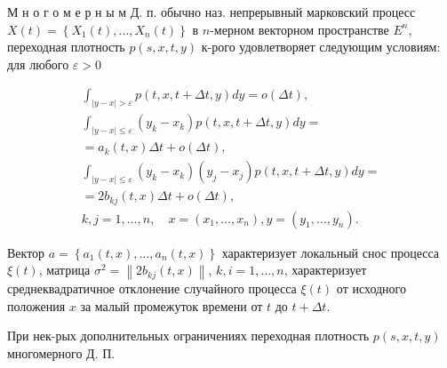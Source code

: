 \documentclass[10pt]{article}
\begin{document}
М н о г о м е р н ы м Д. п. обычно наз. непрерывный марковский процесс $X(t)=\left\{X_{1}(t), \ldots, X_{n}(t)\right\}$ в $n$-мерном векторном пространстве $E^{n}$, переходная плотность $p(s, x, t, y)$ к-рого удовлетворяет следующим условиям: для любого $\varepsilon>0$



\[

\begin{gathered}

\int_{|y-x|>\varepsilon} p(t, x, t+\Delta t, y) d y=o(\Delta t), \\

\int_{|y-x| \leqslant \varepsilon}\left(y_{k}-x_{k}\right) p(t, x, t+\Delta t, y) d y= \\

=a_{k}(t, x) \Delta t+o(\Delta t), \\

\int_{|y-x| \leqslant \varepsilon}\left(y_{k}-x_{k}\right)\left(y_{j}-x_{j}\right) p(t, x, t+\Delta t, y) d y= \\

=2 b_{k j}(t, x) \Delta t+o(\Delta t), \\

k, j=1, \ldots, n, \quad x=\left(x_{1}, \ldots, x_{n}\right), y=\left(y_{1}, \ldots, y_{n}\right) .

\end{gathered}

\]



Вектор $a=\left\{a_{1}(t, x), \ldots, a_{n}(t, x)\right\}$ характеризует локальный снос процесса $\xi(t)$, матрица $\sigma^{2}=\left\|2 b_{k j}(t, x)\right\|$, $k, i=1, \ldots, n$, характеризует среднеквадратичное отклонение случайного процесса $\xi(t)$ от исходного положения $x$ за малый промежуток времени от $t$ до $t+\Delta t$.



При нек-рых дополнительных ограничениях переходная плотность $p(s, x, t, y)$ многомерного Д. П.
\end{document}
